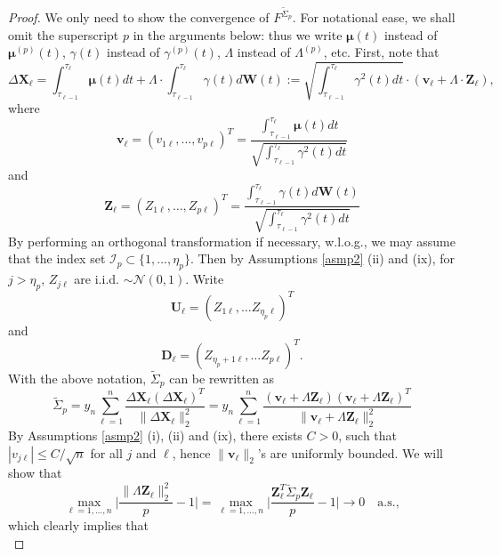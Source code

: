 \documentclass[a4paper,11pt]{article}
\theoremstyle{plain}
\theoremstyle{definition}
\begin{document}
    \begin{proof}
    	We only need to show the convergence of $F^{\widetilde{\Sigma}_p}$. For notational ease, we shall omit the superscript $p$ in the arguments below: thus we write $\boldsymbol{\mu}(t)$ instead of $\boldsymbol{\mu}^{(p)}(t)$, $\gamma(t)$ instead of $\gamma^{(p)}(t)$, $\Lambda$ instead of $\Lambda^{(p)}$, etc. First, note that
    	\[ \Delta \mathbf{X}_\ell = \int_{\tau_{\ell-1}}^{\tau_\ell} \boldsymbol{\mu}(t) dt + \Lambda \cdot \int_{\tau_{\ell-1}}^{\tau_\ell} \gamma(t) d\mathbf{W}(t) := \sqrt{\int_{\tau_{\ell-1}}^{\tau_\ell} \gamma^2(t) dt}\cdot (\mathbf{v}_\ell + \Lambda \cdot \mathbf{Z}_\ell), \]
    	where
    	\[ \mathbf{v}_\ell = (v_{1\ell}, \dots, v_{p\ell})^T = \frac{\int_{\tau_{\ell-1}}^{\tau_\ell} \boldsymbol{\mu}(t) dt}{\sqrt{\int_{\tau_{\ell-1}}^{\tau_\ell} \gamma^2(t) dt}} \]
    	and
    	\[ \mathbf{Z}_\ell = (Z_{1\ell}, \dots, Z_{p\ell})^T = \frac{\int_{\tau_{\ell-1}}^{\tau_\ell} \gamma(t) d\mathbf{W}(t)}{\sqrt{\int_{\tau_{\ell-1}}^{\tau_\ell} \gamma^2(t) dt}} \]
    	By performing an orthogonal transformation if necessary, w.l.o.g., we may assume that the index set $\mathcal{I}_p \subset \{ 1, \dots, \eta_p \} $. Then by Assumptions \ref{asmp2} (ii) and (ix), for $j > \eta_p$, $Z_{j\ell}$ are i.i.d. $\sim \mathcal{N}(0, 1)$. Write
    	\[ \mathbf{U}_\ell = (Z_{1\ell}, \dots Z_{\eta_p\ell})^T \]
    	and 
    	\[ \mathbf{D}_\ell = (Z_{\eta_{p}+1\ell}, \dots Z_{p\ell})^T.\]
    	With the above notation, $\widetilde{\Sigma}_p$ can be rewritten as
    	\begin{equation}
    	\widetilde{\Sigma}_p = y_n \sum_{\ell=1}^{n} \frac{\Delta \mathbf{X}_\ell (\Delta \mathbf{X}_\ell)^T}{\|\Delta \mathbf{X}_\ell\|_2^2} = y_n \sum_{\ell=1}^{n} \frac{(\mathbf{v}_\ell + \Lambda \mathbf{Z}_\ell) (\mathbf{v}_\ell + \Lambda \mathbf{Z}_\ell)^T}{\|\mathbf{v}_\ell + \Lambda \mathbf{Z}_\ell\|_2^2}
    	\end{equation}
    	By Assumptions \ref{asmp2} (i), (ii) and (ix), there exists $C > 0$, such that $|v_{j\ell}| \leq C / \sqrt{n}$ for all $j$ and $\ell$, hence $\| \mathbf{v}_\ell\|_2$'s are uniformly bounded. We will show that
    	\begin{equation} \label{334}
    		\max_{\ell = 1, \dots, n} \Bigg|\frac{  \| \Lambda \mathbf{Z}_\ell \|_2^2}{p} - 1\Bigg| = \max_{\ell = 1, \dots, n} \Bigg| \frac{  \mathbf{Z}_\ell^T \breve{\Sigma}_p \mathbf{Z}_\ell}{p} - 1\Bigg| \rightarrow 0 \quad \text{a.s.},
    	\end{equation}
    	which clearly implies that
    	\begin{equation} \label{335}

\end{equation}
\end{proof}
\end{document}
